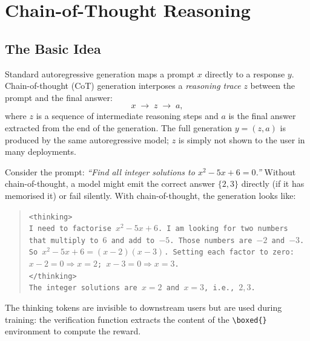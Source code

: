 \section{Chain-of-Thought Reasoning}
\label{sec:cot}

\subsection{The Basic Idea}

Standard autoregressive generation maps a prompt $x$ directly to a
response $y$. Chain-of-thought (CoT) generation
interposes a \emph{reasoning trace} $z$ between
the prompt and the final answer:
\[
x \;\longrightarrow\; z \;\longrightarrow\; a,
\]
where $z$ is a sequence of intermediate reasoning steps and $a$ is the
final answer extracted from the end of the generation. The full
generation $y = (z, a)$ is produced by the same autoregressive model;
$z$ is simply not shown to the user in many deployments.

\begin{example}
\label{ex:cot-math}
Consider the prompt: \emph{``Find all integer solutions to
$x^2 - 5x + 6 = 0$.''} Without chain-of-thought, a model might emit
the correct answer $\{2, 3\}$ directly (if it has memorised it) or
fail silently. With chain-of-thought, the generation looks like:

\begin{quote}
\texttt{<thinking>}\\
\texttt{I need to factorise $x^2 - 5x + 6$. I am looking for two numbers}\\
\texttt{that multiply to $6$ and add to $-5$. Those numbers are $-2$ and $-3$.}\\
\texttt{So $x^2 - 5x + 6 = (x-2)(x-3)$. Setting each factor to zero:}\\
\texttt{$x - 2 = 0 \Rightarrow x = 2$; $x - 3 = 0 \Rightarrow x = 3$.}\\
\texttt{</thinking>}\\
\texttt{The integer solutions are $x = 2$ and $x = 3$, i.e., $\boxed{2, 3}$.}
\end{quote}

The thinking tokens are invisible to downstream users but are used
during training: the verification function extracts the content of the
\texttt{\textbackslash boxed\{\}} environment to compute the reward.
\end{example}

